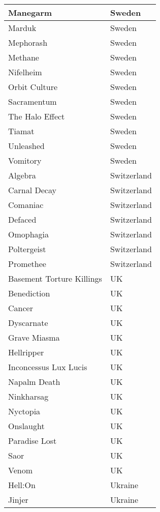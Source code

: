 \documentclass[12pt, a4paper, twoside]{report}
\begin{document}
\begin{center}
\begin{longtable}{|p{5cm}|p{5cm}|}
Manegarm & Sweden \\ \hline
Marduk & Sweden \\ \hline
Mephorash & Sweden \\ \hline
Methane & Sweden \\ \hline
Nifelheim & Sweden \\ \hline
Orbit Culture & Sweden \\ \hline
Sacramentum﻿ & Sweden \\ \hline
The Halo Effect & Sweden \\ \hline
Tiamat & Sweden \\ \hline
Unleashed & Sweden \\ \hline
Vomitory & Sweden \\ \hline
Algebra & Switzerland \\ \hline
Carnal Decay & Switzerland \\ \hline
Comaniac & Switzerland \\ \hline
Defaced & Switzerland \\ \hline
Omophagia & Switzerland \\ \hline
Poltergeist & Switzerland \\ \hline
Promethee & Switzerland \\ \hline
Basement Torture Killings & UK \\ \hline
Benediction & UK \\ \hline
Cancer & UK \\ \hline
Dyscarnate & UK \\ \hline
Grave Miasma & UK \\ \hline
Hellripper & UK \\ \hline
Inconcessus Lux Lucis & UK \\ \hline
Napalm Death & UK \\ \hline
Ninkharsag & UK \\ \hline
Nyctopia & UK \\ \hline
Onslaught & UK \\ \hline
Paradise Lost & UK \\ \hline
Saor & UK \\ \hline
Venom & UK \\ \hline
Hell:On & Ukraine \\ \hline
Jinjer & Ukraine \\ \hline
		\end{longtable}
	\end{center}
\end{document}

